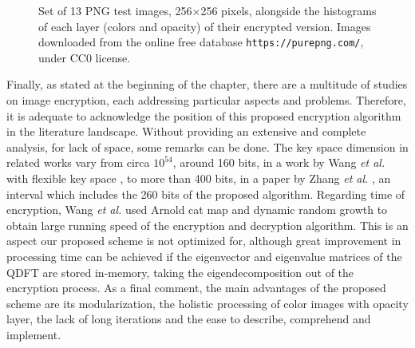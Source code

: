 \begin{figure}[htbp]
\caption{Set of 13 PNG test images, 256$ \times $256 pixels, alongside the histograms of each layer (colors and opacity) of their encrypted version. Images downloaded from the online free database \texttt{https://purepng.com/}, under CC0 license.}
\label{fig:allhistograms}
\end{figure}

Finally, as stated at the beginning of the chapter, there are a multitude of studies on image encryption, each addressing particular aspects and problems. Therefore, it is adequate to acknowledge the position of this proposed encryption algorithm in the literature landscape. Without providing an extensive and complete analysis, for lack of space, some remarks can be done. The key space dimension in related works vary from circa $ 10^{54} $, around 160 bits, in a work by Wang \textit{et al.} with flexible key space \cite{wang2015novel}, to more than 400 bits, in a paper by Zhang \textit{et al.} \cite{zhang2015new}, an interval which includes the 260 bits of the proposed algorithm. Regarding time of encryption, Wang \textit{et al.} \cite{wang2015novelchaotic} used Arnold cat map and dynamic random growth to obtain large running speed of the encryption and decryption algorithm. This is an aspect our proposed scheme is not optimized for, although great improvement in processing time can be achieved if the eigenvector and eigenvalue matrices of the QDFT are stored in-memory, taking the eigendecomposition out of the encryption process. As a final comment, the main advantages of the proposed scheme are its modularization, the holistic processing of color images with opacity layer, the lack of long iterations and the ease to describe, comprehend and implement.

